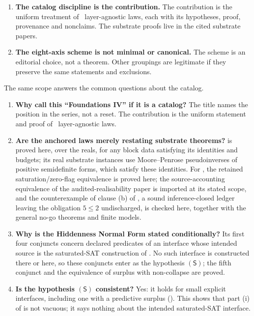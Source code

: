 \begin{enumerate}[label=\textbf{N\arabic*.}, leftmargin=*]
\item \textbf{The catalog discipline is the contribution.}
The contribution is the uniform treatment of \NumLaws\ layer-agnostic
laws, each with its hypotheses, proof, provenance and nonclaims.  The
substrate proofs live in the cited substrate papers.

\item \textbf{The eight-axis scheme is not minimal or canonical.}
The scheme is an editorial choice, not a theorem.  Other groupings are
legitimate if they preserve the same statements and exclusions.
\end{enumerate}

The same scope answers the common questions about the catalog.

\begin{enumerate}[label=\textbf{O\arabic*.}, leftmargin=*]
\item \textbf{Why call this ``Foundations IV'' if it is a catalog?}
The title names the position in the series, not a reset.  The
contribution is the uniform statement and proof of \NumLaws\
layer-agnostic laws.

\item \textbf{Are the anchored laws merely restating substrate theorems?}
\Fref{F6} is proved here, over the reals, for any block data
satisfying its identities and budgets; its real substrate instances
use Moore--Penrose pseudoinverses of positive semidefinite forms, which
satisfy these identities.  For
, the retained saturation/zero-flag equivalence is proved
here; the source-accounting equivalence of the audited-realisability
paper is imported at its stated scope, and the counterexample of clause
(b) of \Cref{prop:F53}, a sound inference-closed ledger leaving the
obligation \(5\le2\) undischarged, is checked here, together with the
general no-go theorems and finite models.

\item \textbf{Why is the Hiddenness Normal Form stated conditionally?}
Its first four conjuncts concern declared predicates of an interface
whose intended source is the saturated-SAT construction of
\citet{Tsiokos2026PvNP}.  No such interface is constructed there or
here, so these conjuncts enter as the hypothesis \((\mathsf S)\); the
fifth conjunct and the equivalence of surplus with non-collapse are
proved.

\item \textbf{Is the hypothesis \((\mathsf S)\) consistent?}
Yes: it holds for small explicit interfaces, including one with a
predictive surplus (\Cref{sec:access:hiddenness}).  This shows that
part (i) of \Cref{thm:F13a} is not vacuous; it says nothing about the
intended saturated-SAT interface.


\end{enumerate}
